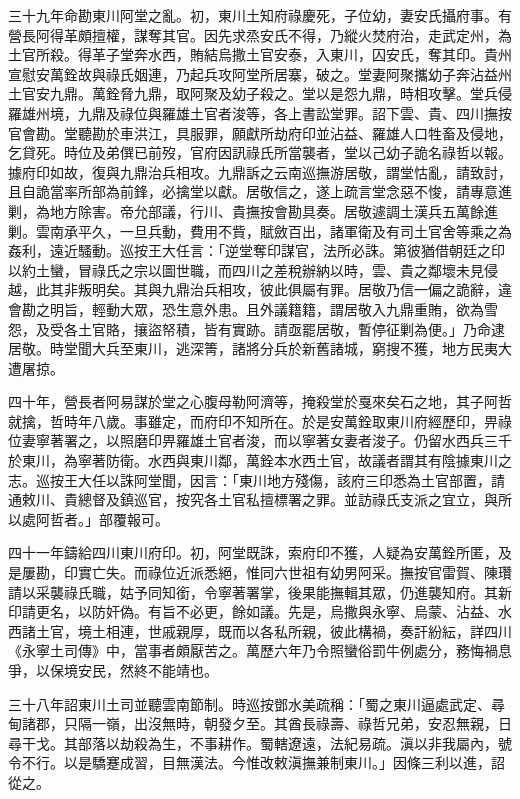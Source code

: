 \begin{pinyinscope}
三十九年命勘東川阿堂之亂。初，東川土知府祿慶死，子位幼，妻安氏攝府事。有營長阿得革頗擅權，謀奪其官。因先求烝安氏不得，乃縱火焚府治，走武定州，為土官所殺。得革子堂奔水西，賄結烏撒土官安泰，入東川，囚安氏，奪其印。貴州宣慰安萬銓故與祿氏姻連，乃起兵攻阿堂所居寨，破之。堂妻阿聚攜幼子奔沾益州土官安九鼎。萬銓脅九鼎，取阿聚及幼子殺之。堂以是怨九鼎，時相攻擊。堂兵侵羅雄州境，九鼎及祿位與羅雄土官者浚等，各上書訟堂罪。詔下雲、貴、四川撫按官會勘。堂聽勘於車洪江，具服罪，願獻所劫府印並沾益、羅雄人口牲畜及侵地，乞貸死。時位及弟僎已前歿，官府因訊祿氏所當襲者，堂以己幼子詭名祿哲以報。據府印如故，復與九鼎治兵相攻。九鼎訴之云南巡撫游居敬，謂堂怙亂，請致討，且自詭當率所部為前鋒，必擒堂以獻。居敬信之，遂上疏言堂念惡不悛，請專意進剿，為地方除害。帝允部議，行川、貴撫按會勘具奏。居敬遽調土漢兵五萬餘進剿。雲南承平久，一旦兵動，費用不貲，賦斂百出，諸軍衛及有司土官舍等乘之為姦利，遠近騷動。巡按王大任言：「逆堂奪印謀官，法所必誅。第彼猶借朝廷之印以約土蠻，冒祿氏之宗以圖世職，而四川之差稅辦納以時，雲、貴之鄰壞未見侵越，此其非叛明矣。其與九鼎治兵相攻，彼此俱屬有罪。居敬乃信一偏之詭辭，違會勘之明旨，輕動大眾，恐生意外患。且外議籍籍，謂居敬入九鼎重賄，欲為雪怨，及受各土官賂，攘盜帑積，皆有實跡。請亟罷居敬，暫停征剿為便。」乃命逮居敬。時堂聞大兵至東川，逃深箐，諸將分兵於新舊諸城，窮搜不獲，地方民夷大遭屠掠。

四十年，營長者阿易謀於堂之心腹母勒阿濟等，掩殺堂於戛來矣石之地，其子阿哲就擒，哲時年八歲。事雖定，而府印不知所在。於是安萬銓取東川府經歷印，畀祿位妻寧著署之，以照磨印畀羅雄土官者浚，而以寧著女妻者浚子。仍留水西兵三千於東川，為寧著防衛。水西與東川鄰，萬銓本水西土官，故議者謂其有陰據東川之志。巡按王大任以誅阿堂聞，因言：「東川地方殘傷，該府三印悉為土官部置，請通敕川、貴總督及鎮巡官，按究各土官私擅標署之罪。並訪祿氏支派之宜立，與所以處阿哲者。」部覆報可。

四十一年鑄給四川東川府印。初，阿堂既誅，索府印不獲，人疑為安萬銓所匿，及是屢勘，印實亡失。而祿位近派悉絕，惟同六世祖有幼男阿采。撫按官雷賀、陳瓚請以采襲祿氏職，姑予同知銜，令寧著署掌，後果能撫輯其眾，仍進襲知府。其新印請更名，以防奸偽。有旨不必更，餘如議。先是，烏撒與永寧、烏蒙、沾益、水西諸土官，境土相連，世戚親厚，既而以各私所親，彼此構禍，奏訐紛紜，詳四川《永寧土司傳》中，當事者頗厭苦之。萬歷六年乃令照蠻俗罰牛例處分，務悔禍息爭，以保境安民，然終不能靖也。

三十八年詔東川土司並聽雲南節制。時巡按鄧水美疏稱：「蜀之東川逼處武定、尋甸諸郡，只隔一嶺，出沒無時，朝發夕至。其酋長祿壽、祿哲兄弟，安忍無親，日尋干戈。其部落以劫殺為生，不事耕作。蜀轄遼遠，法紀易疏。滇以非我屬內，號令不行。以是驕蹇成習，目無漢法。今惟改敕滇撫兼制東川。」因條三利以進，詔從之。


\end{pinyinscope}
